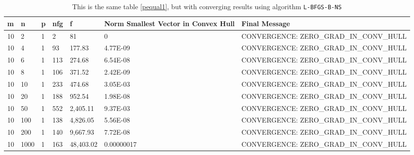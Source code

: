 \begin{center}
  \begin{table}
    \begin{tabular}{|l|l|l|l|l|p{1.6cm}|p{5.3cm}|}
      \hline
       m & n & p & nfg & f & Norm Smallest Vector in Convex Hull & Final Message \\ \hline
       10 & 2 & 1 & 2 & 81 & 0 & CONVERGENCE: ZERO\_GRAD\_IN\_CONV\_HULL \\
       10 & 4 & 1 & 93 & 177.83 & 4.77E-09 & CONVERGENCE: ZERO\_GRAD\_IN\_CONV\_HULL \\
       10 & 6 &	1 & 113 & 274.68 & 6.54E-08 & CONVERGENCE: ZERO\_GRAD\_IN\_CONV\_HULL \\
       10 & 8 &	1 & 106 & 371.52 & 2.42E-09 & CONVERGENCE: ZERO\_GRAD\_IN\_CONV\_HULL \\
       10 & 10 & 1 & 233 & 474.68 & 3.05E-03 & CONVERGENCE: ZERO\_GRAD\_IN\_CONV\_HULL \\
       10 & 20 & 1 & 188 & 952.54 & 1.98E-08 & CONVERGENCE: ZERO\_GRAD\_IN\_CONV\_HULL \\
       10 & 50 & 1 & 552 & 2,405.11 & 9.37E-03 & CONVERGENCE: ZERO\_GRAD\_IN\_CONV\_HULL \\
       10 & 100 & 1 & 138 & 4,826.05 & 5.56E-08 & CONVERGENCE: ZERO\_GRAD\_IN\_CONV\_HULL \\
       10 & 200 & 1 & 140 & 9,667.93 & 7.72E-08 & CONVERGENCE: ZERO\_GRAD\_IN\_CONV\_HULL \\
       10 & 1000 & 1 & 163 & 48,403.02 & 0.00000017 & CONVERGENCE: ZERO\_GRAD\_IN\_CONV\_HULL \\ \hline
    \end{tabular}
    \caption[Converging Runs for $p = 1$]{This is the same table \ref{pequal1}, but with converging results using algorithm \texttt{L-BFGS-B-NS}}
    \label{p1table}
  \end{table}
\end{center}
\pagebreak
